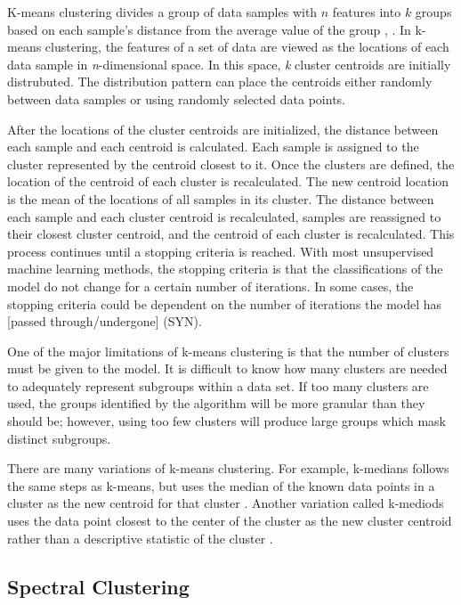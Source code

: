 K-means clustering divides a group of data samples with $n$ features into $k$ groups based on each sample's distance from the average value of the group \cite{macqueen1967}, \cite{Hartigan1979}. In k-means clustering, the features of a set of data are viewed as the locations of each data sample in \textit{n}-dimensional space. In this space, \textit{k} cluster centroids are initially distrubuted. The distribution pattern can place the centroids either randomly between data samples or using randomly selected data points.

After the locations of the cluster centroids are initialized, the distance between each sample and each centroid is calculated. Each sample is assigned to the cluster represented by the centroid closest to it. Once the clusters are defined, the location of the centroid of each cluster is recalculated. The new centroid location is the mean of the locations of all samples in its cluster. The distance between each sample and each cluster centroid is recalculated, samples are reassigned to their closest cluster centroid, and the centroid of each cluster is recalculated. This process continues until a stopping criteria is reached. With most unsupervised machine learning methods, the stopping criteria is that the classifications of the model do not change for a certain number of iterations. In some cases, the stopping criteria could be dependent on the number of iterations the model has [passed through/undergone] (SYN). 

One of the major limitations of k-means clustering is that the number of clusters must be given to the model. It is difficult to know how many clusters are needed to adequately represent subgroups within a data set. If too many clusters are used, the groups identified by the algorithm will be more granular than they should be; however, using too few clusters will produce large groups which mask distinct subgroups. 

There are many variations of k-means clustering. For example, k-medians follows the same steps as k-means, but uses the median of the known data points in a cluster as the new centroid for that cluster \cite{Juan1998}. Another variation called k-mediods uses the data point closest to the center of the cluster as the new cluster centroid rather than a descriptive statistic of the cluster \cite{Kaufman1987}.

\subsection{Spectral Clustering}

